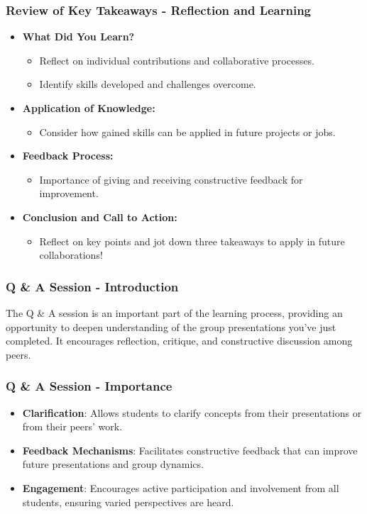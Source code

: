 \documentclass[aspectratio=169]{beamer}
\begin{document}
\begin{frame}[fragile]
    \frametitle{Review of Key Takeaways - Reflection and Learning}
    \begin{itemize}
        \item \textbf{What Did You Learn?}
        \begin{itemize}
            \item Reflect on individual contributions and collaborative processes.
            \item Identify skills developed and challenges overcome.
        \end{itemize}
        
        \item \textbf{Application of Knowledge:}
        \begin{itemize}
            \item Consider how gained skills can be applied in future projects or jobs.
        \end{itemize}
        
        \item \textbf{Feedback Process:}
        \begin{itemize}
            \item Importance of giving and receiving constructive feedback for improvement.
        \end{itemize}
        
        \item \textbf{Conclusion and Call to Action:}
        \begin{itemize}
            \item Reflect on key points and jot down three takeaways to apply in future collaborations!
        \end{itemize}
    \end{itemize}
\end{frame}

\begin{frame}[fragile]
    \frametitle{Q \& A Session - Introduction}
    The Q \& A session is an important part of the learning process, 
    providing an opportunity to deepen understanding of the group presentations you've just completed.
    It encourages reflection, critique, and constructive discussion among peers.
\end{frame}

\begin{frame}[fragile]
    \frametitle{Q \& A Session - Importance}
    \begin{itemize}
        \item \textbf{Clarification}: 
        Allows students to clarify concepts from their presentations or from their peers’ work.
        
        \item \textbf{Feedback Mechanisms}: 
        Facilitates constructive feedback that can improve future presentations and group dynamics.
        
        \item \textbf{Engagement}: 
        Encourages active participation and involvement from all students, ensuring varied perspectives are heard.
    \end{itemize}
\end{frame}
\end{document}
